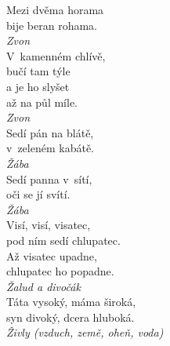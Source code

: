 \begin{multicols}{\value{columnsthindata}}
\noindent
Mezi dvěma horama\\
bije beran rohama.\\[1 mm]
{\sl Zvon}\\

\noindent
V~kamenném chlívě,\\
bučí tam týle\\
a je ho slyšet\\
až na půl míle.\\[1 mm]
{\sl Zvon}\\

\noindent
Sedí pán na blátě,\\
v~zeleném kabátě.\\[1 mm]
{\sl Žába}\\

\noindent
Sedí panna v~sítí,\\
oči se jí svítí.\\[1 mm]
{\sl Žába}\\

\noindent
Visí, visí, visatec,\\
pod ním sedí chlupatec.\\
Až visatec upadne,\\
chlupatec ho popadne.\\[1 mm]
{\sl Žalud a divočák}\\

\noindent
Táta vysoký, máma široká,\\
syn divoký, dcera hluboká.\\[1 mm]
{\sl Živly (vzduch, země, oheň, voda)}\\

\end{multicols}
\clearpage

